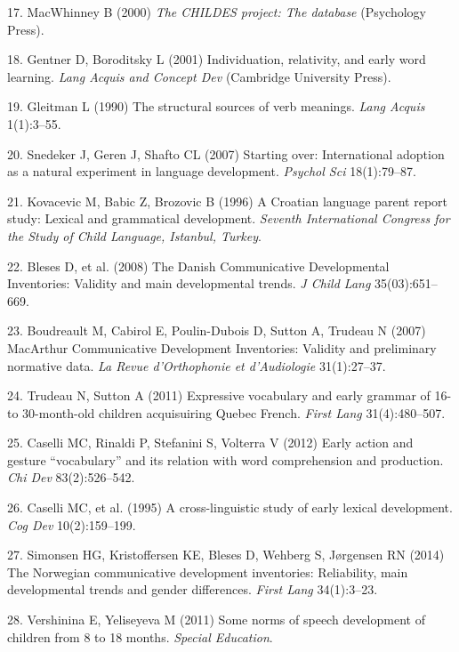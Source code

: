 \documentclass[english,man]{apa6}
\theoremstyle{definition}
\theoremstyle{definition}
\theoremstyle{definition}
\theoremstyle{remark}
\begin{document}
\hypertarget{ref-macwhinney2000}{}
17. MacWhinney B (2000) \emph{The CHILDES project: The database}
(Psychology Press).

\hypertarget{ref-gentner2001}{}
18. Gentner D, Boroditsky L (2001) Individuation, relativity, and early
word learning. \emph{Lang Acquis and Concept Dev} (Cambridge University
Press).

\hypertarget{ref-gleitman1990}{}
19. Gleitman L (1990) The structural sources of verb meanings.
\emph{Lang Acquis} 1(1):3--55.

\hypertarget{ref-snedeker2007}{}
20. Snedeker J, Geren J, Shafto CL (2007) Starting over: International
adoption as a natural experiment in language development. \emph{Psychol
Sci} 18(1):79--87.

\hypertarget{ref-kovacevic1996}{}
21. Kovacevic M, Babic Z, Brozovic B (1996) A Croatian language parent
report study: Lexical and grammatical development. \emph{Seventh
International Congress for the Study of Child Language, Istanbul,
Turkey}.

\hypertarget{ref-bleses2008}{}
22. Bleses D, et al. (2008) The Danish Communicative Developmental
Inventories: Validity and main developmental trends. \emph{J Child Lang}
35(03):651--669.

\hypertarget{ref-boudreault2007}{}
23. Boudreault M, Cabirol E, Poulin-Dubois D, Sutton A, Trudeau N (2007)
MacArthur Communicative Development Inventories: Validity and
preliminary normative data. \emph{La Revue d'Orthophonie et
d'Audiologie} 31(1):27--37.

\hypertarget{ref-trudeau2011}{}
24. Trudeau N, Sutton A (2011) Expressive vocabulary and early grammar
of 16-to 30-month-old children acquisuiring Quebec French. \emph{First
Lang} 31(4):480--507.

\hypertarget{ref-caselli2012}{}
25. Caselli MC, Rinaldi P, Stefanini S, Volterra V (2012) Early action
and gesture ``vocabulary'' and its relation with word comprehension and
production. \emph{Chi Dev} 83(2):526--542.

\hypertarget{ref-caselli1995}{}
26. Caselli MC, et al. (1995) A cross-linguistic study of early lexical
development. \emph{Cog Dev} 10(2):159--199.

\hypertarget{ref-simonsen2014}{}
27. Simonsen HG, Kristoffersen KE, Bleses D, Wehberg S, Jørgensen RN
(2014) The Norwegian communicative development inventories: Reliability,
main developmental trends and gender differences. \emph{First Lang}
34(1):3--23.

\hypertarget{ref-vershinina2011}{}
28. Vershinina E, Yeliseyeva M (2011) Some norms of speech development
of children from 8 to 18 months. \emph{Special Education}.
\end{document}
